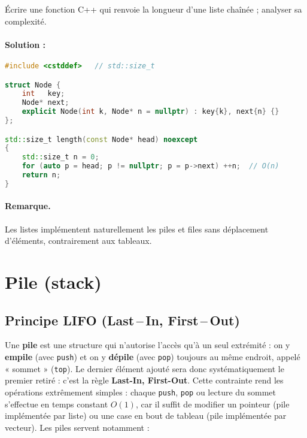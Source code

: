 \begin{exercice}[Parcours]
Écrire une fonction C++ qui renvoie la longueur d’une liste chaînée ;
analyser sa complexité.
\end{exercice}

\paragraph{Solution : }



\begin{lstlisting}[language=C++,caption={list\_length.cpp}]
#include <cstddef>   // std::size_t

struct Node {
    int   key;
    Node* next;
    explicit Node(int k, Node* n = nullptr) : key{k}, next{n} {}
};

std::size_t length(const Node* head) noexcept
{
    std::size_t n = 0;
    for (auto p = head; p != nullptr; p = p->next) ++n;  // O(n)
    return n;
}
\end{lstlisting}


\paragraph{Remarque.}
Les listes implémentent naturellement les piles et files sans déplacement
d’éléments, contrairement aux tableaux.

\section{Pile (stack)}

\subsection{Principe LIFO (Last\,–\,In, First\,–\,Out)}

Une \textbf{pile} est une structure qui n’autorise l’accès qu’à un seul extrémité : on y \textbf{empile} (avec \lstinline|push|) et on y \textbf{dépile}
(avec \lstinline|pop|) toujours au même endroit, appelé « sommet »
(\lstinline|top|).  Le dernier élément ajouté sera donc systématiquement le
premier retiré : c’est la règle \textbf{Last-In, First-Out}.
Cette contrainte rend les opérations extrêmement simples : chaque
\lstinline|push|, \lstinline|pop| ou lecture du sommet s’effectue en temps
constant $O(1)$, car il suffit de modifier un pointeur (pile implémentée par
liste) ou une case en bout de tableau (pile implémentée par vecteur).
Les piles servent notamment :

